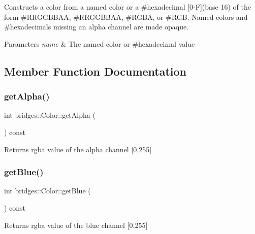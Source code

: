 Constructs a color from a named color or a \#hexadecimal \mbox{[}0-\/F\mbox{]}(base 16) of the form \#\+R\+R\+G\+G\+B\+B\+AA, \#\+R\+R\+G\+G\+B\+B\+AA, \#\+R\+G\+BA, or \#\+R\+GB. Named colors and \#hexadecimals missing an alpha channel are made opaque.


\begin{DoxyParams}{Parameters}
{\em name} & The named color or \#hexadecimal value \\
\hline
\end{DoxyParams}


\subsection{Member Function Documentation}
\hypertarget{classbridges_1_1_color_a61523716f5597013d57bc98eae1fe96a}{}\label{classbridges_1_1_color_a61523716f5597013d57bc98eae1fe96a} 
\subsubsection{\texorpdfstring{get\+Alpha()}{getAlpha()}}
{\footnotesize\ttfamily int bridges\+::\+Color\+::get\+Alpha (\begin{DoxyParamCaption}{ }\end{DoxyParamCaption}) const\hspace{0.3cm}{\ttfamily [inline]}}

\begin{DoxyReturn}{Returns}
rgba value of the alpha channel \mbox{[}0,255\mbox{]} 
\end{DoxyReturn}
\hypertarget{classbridges_1_1_color_aa7a70279f41f2cceb640162c43a2a382}{}\label{classbridges_1_1_color_aa7a70279f41f2cceb640162c43a2a382} 
\subsubsection{\texorpdfstring{get\+Blue()}{getBlue()}}
{\footnotesize\ttfamily int bridges\+::\+Color\+::get\+Blue (\begin{DoxyParamCaption}{ }\end{DoxyParamCaption}) const\hspace{0.3cm}{\ttfamily [inline]}}

\begin{DoxyReturn}{Returns}
rgba value of the blue channel \mbox{[}0,255\mbox{]} 
\end{DoxyReturn}
\hypertarget{classbridges_1_1_color_a93f8e016e1f1e6c177924ad8712e3e48}{}\label{classbridges_1_1_color_a93f8e016e1f1e6c177924ad8712e3e48} 
